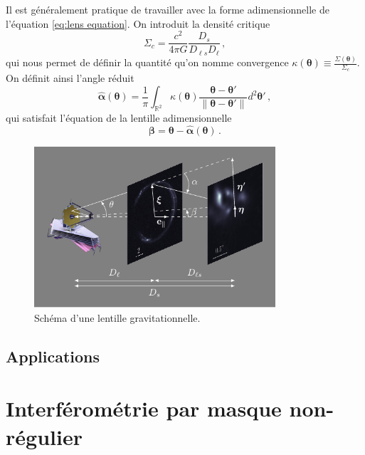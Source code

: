 Il est généralement pratique de travailler avec la forme adimensionnelle de l'équation \eqref{eq:lens equation}. 
On introduit la densité critique 
\begin{equation}\label{eq:densite critique}
        \Sigma_c = \frac{c^2}{4 \pi G}\frac{D_{s}}{D_{\ell s} D_\ell}\, ,
\end{equation} 
qui nous permet de définir la quantité qu'on nomme convergence $\displaystyle \kappa(\boldsymbol{ \theta} ) \equiv \frac{\Sigma(\boldsymbol{ \theta})}{\Sigma_c}$. 
On définit ainsi l'angle réduit 
\begin{equation}\label{eq:alpha adim}
        \hat{\boldsymbol{ \alpha}} (\boldsymbol{ \theta}) = \frac{1}{\pi}\int_{\mathbb{R}^{2}} \kappa(\boldsymbol{ \theta} )
        \frac{\boldsymbol{ \theta} - \boldsymbol{ \theta}'  }{\lVert \boldsymbol{ \theta} - \boldsymbol{ \theta}' \rVert  } d^{2}\boldsymbol{ \theta}'\, ,
\end{equation} 
qui satisfait l'équation de la lentille adimensionnelle 
\begin{equation}\label{eq:lens equation adim}
        \boldsymbol{ \beta} = \boldsymbol{ \theta} - \hat{\boldsymbol{ \alpha}}(\boldsymbol{ \theta})\, . 
\end{equation}

\begin{figure}[H]
        \centering
        \includegraphics[width=0.8\textwidth]{figures/lensing_cartoon}
        \caption{Schéma d'une lentille gravitationnelle.}
        \label{fig:cartoon}
\end{figure}


\subsection{Applications}

\section{Interférométrie par masque non-régulier}

